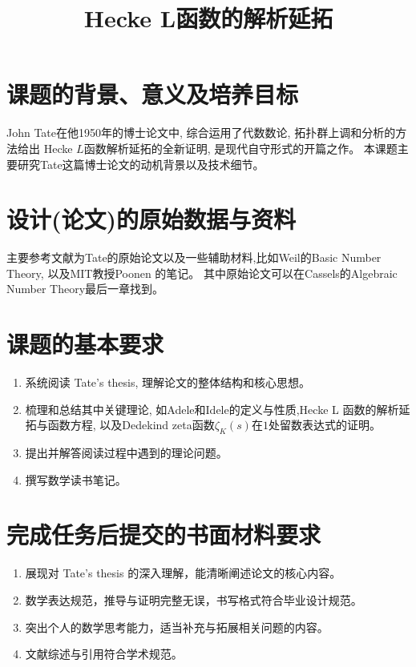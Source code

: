\documentclass[12pt,a4paper]{ctexart}
\newenvironment{enu}{\begin{enumerate}[(1)]}{\end{enumerate}}
\theoremstyle{definition}
\begin{document}
\title{Hecke L函数的解析延拓}
\author{}
\date{}
\maketitle
\section{课题的背景、意义及培养目标}
John Tate在他1950年的博士论文中, 综合运用了代数数论, 拓扑群上调和分析的方法给出
Hecke $L$函数解析延拓的全新证明, 
是现代自守形式的开篇之作。 
本课题主要研究Tate这篇博士论文的动机背景以及技术细节。
\section{设计(论文)的原始数据与资料}
主要参考文献为Tate的原始论文以及一些辅助材料,比如Weil的Basic Number Theory, 以及MIT教授Poonen
的笔记。 
其中原始论文可以在Cassels的Algebraic Number Theory最后一章找到。

\cite{MR1397028}\cite{MR1680912}\cite{MR217026}\cite{MR427267}

\section{课题的基本要求}
\begin{enu} 
    \item 系统阅读 Tate's thesis, 理解论文的整体结构和核心思想。
    \item 梳理和总结其中关键理论, 
    如Adele和Idele的定义与性质,Hecke L 函数的解析延拓与函数方程, 
    以及Dedekind zeta函数$\zeta_K(s)$在$1$处留数表达式的证明。
    \item 提出并解答阅读过程中遇到的理论问题。
    \item 撰写数学读书笔记。
\end{enu}

\section{完成任务后提交的书面材料要求}
\begin{enu} 
    \item 展现对 Tate's thesis 的深入理解，能清晰阐述论文的核心内容。
    \item 数学表达规范，推导与证明完整无误，书写格式符合毕业设计规范。
    \item 突出个人的数学思考能力，适当补充与拓展相关问题的内容。
    \item 文献综述与引用符合学术规范。
\end{enu}





\end{document}
